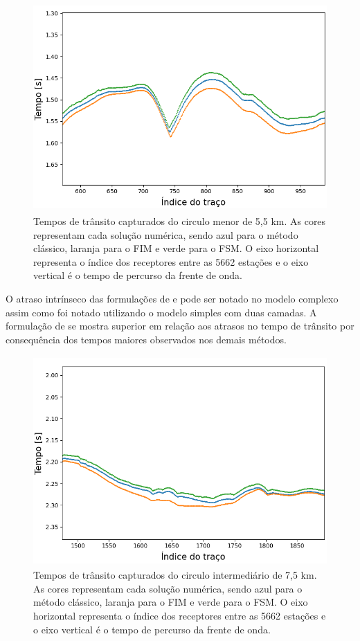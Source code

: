 \begin{figure}[H]
	\centering
	\includegraphics[height=8cm,width=13cm]{Imgs/Resultados/complex_w1.png}		
	\caption{Tempos de trânsito capturados do circulo menor de 5,5 km. As cores representam cada solução numérica, sendo azul para o método clássico, laranja para o FIM e verde para o FSM. O eixo horizontal representa o índice dos receptores entre as 5662 estações e o eixo vertical é o tempo de percurso da frente de onda.}
	\label{fig:overthrust_inner_circle}
\end{figure}

O atraso intrínseco das formulações de  e  pode ser notado no modelo complexo assim como foi notado utilizando o modelo simples com duas camadas. A formulação de  se mostra superior em relação aos atrasos no tempo de trânsito por consequência dos tempos maiores observados nos demais métodos.

\begin{figure}[H]
	\centering
	\includegraphics[height=8cm,width=13cm]{Imgs/Resultados/complex_w2.png}	
	\caption{Tempos de trânsito capturados do circulo intermediário de 7,5 km. As cores representam cada solução numérica, sendo azul para o método clássico, laranja para o FIM e verde para o FSM. O eixo horizontal representa o índice dos receptores entre as 5662 estações e o eixo vertical é o tempo de percurso da frente de onda.}
	\label{fig:overthrust_mid_circle}
\end{figure}

